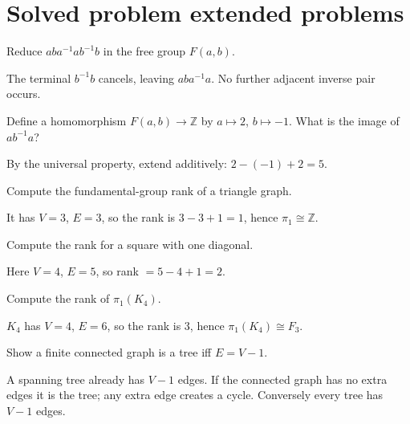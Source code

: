 \section{Solved problem extended problems}

\begin{problem}\label{prob:viii14-01}
Reduce \(aba^{-1}ab^{-1}b\) in the free group \(F(a,b)\).
\end{problem}
\begin{solution}
The terminal \(b^{-1}b\) cancels, leaving \(aba^{-1}a\). No further adjacent inverse pair occurs.
\end{solution}

\begin{problem}\label{prob:viii14-02}
Define a homomorphism \(F(a,b)\to\mathbb Z\) by \(a\mapsto2\), \(b\mapsto-1\). What is the image of \(ab^{-1}a\)?
\end{problem}
\begin{solution}
By the universal property, extend additively: \(2-(-1)+2=5\).
\end{solution}

\begin{problem}\label{prob:viii14-03}
Compute the fundamental-group rank of a triangle graph.
\end{problem}
\begin{solution}
It has \(V=3\), \(E=3\), so the rank is \(3-3+1=1\), hence \(\pi_1\cong\mathbb Z\).
\end{solution}

\begin{problem}\label{prob:viii14-04}
Compute the rank for a square with one diagonal.
\end{problem}
\begin{solution}
Here \(V=4\), \(E=5\), so rank \(=5-4+1=2\).
\end{solution}

\begin{problem}\label{prob:viii14-05}
Compute the rank of \(\pi_1(K_4)\).
\end{problem}
\begin{solution}
\(K_4\) has \(V=4\), \(E=6\), so the rank is \(3\), hence \(\pi_1(K_4)\cong F_3\).
\end{solution}

\begin{problem}\label{prob:viii14-06}
Show a finite connected graph is a tree iff \(E=V-1\).
\end{problem}
\begin{solution}
A spanning tree already has \(V-1\) edges. If the connected graph has no extra edges it is the tree; any extra edge creates a cycle. Conversely every tree has \(V-1\) edges.
\end{solution}

